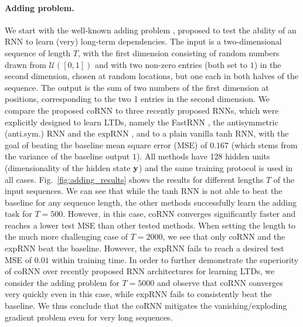 \documentclass{article} \usepackage{iclr2021_conference,times}
\newcommand{\by}{{\bf y}}
\newcommand{\fref}[1] {Fig.~\ref{#1}}
\begin{document}
\paragraph{Adding problem.} We start with the well-known adding problem \citep{lstm}, proposed to test the ability of an RNN to learn (very) long-term dependencies. The input is a two-dimensional sequence of length $T$, with the first dimension consisting of random numbers drawn from $\mathcal{U}([0,1])$ and with two non-zero entries (both set to $1$) in the second dimension, chosen at random locations, but one each in both halves of the sequence. The output is the sum of two numbers of the first dimension at positions, corresponding to the two 1 entries in the second dimension. We compare the proposed coRNN to three recently proposed RNNs, which were explicitly designed to learn LTDs, namely the FastRNN \citep{fastrnn}, the antisymmetric (anti.sym.) RNN \citep{anti} and the expRNN \citep{expRNN}, and to a plain vanilla tanh RNN, with the goal of beating the baseline mean square error (MSE) of $0.167$ (which stems from the variance of the baseline output $1$). All methods have 128 hidden units (dimensionality of the hidden state $\by$) and the same training protocol is used in all cases. \fref{fig:adding_results} shows the results for different lengths $T$ of the input sequences. We can see that while the tanh RNN is not able to beat the baseline for any sequence length, the other methods successfully learn the adding task for $T=500$. However, in this case, coRNN converges significantly faster and reaches a lower test MSE than other tested methods. When setting the length to the much more challenging case of $T=2000$, we see that only coRNN and the expRNN beat the baseline. However, the expRNN fails to reach a desired test MSE of $0.01$ within training time. In order to further demonstrate the superiority of coRNN over recently proposed RNN architectures for learning LTDs, we consider the adding problem for $T=5000$ and observe that coRNN converges very quickly even in this case, while expRNN fails to consistently beat the baseline. We thus conclude that the coRNN mitigates the vanishing/exploding gradient problem even for very long sequences.
\end{document}
